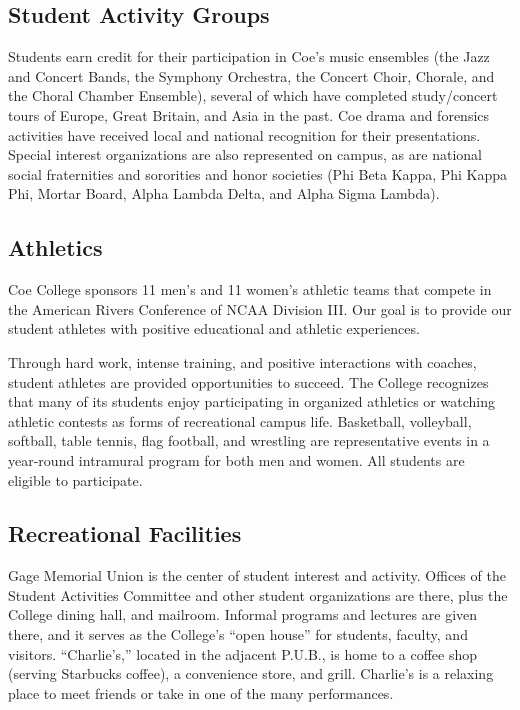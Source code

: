 \documentclass[
  letterpaper,
]{scrbook}
\begin{document}
\subsection{Student Activity Groups}\label{student-activity-groups}

Students earn credit for their participation in Coe's music ensembles
(the Jazz and Concert Bands, the Symphony Orchestra, the Concert Choir,
Chorale, and the Choral Chamber Ensemble), several of which have
completed study/concert tours of Europe, Great Britain, and Asia in the
past. Coe drama and forensics activities have received local and
national recognition for their presentations. Special interest
organizations are also represented on campus, as are national social
fraternities and sororities and honor societies (Phi Beta Kappa, Phi
Kappa Phi, Mortar Board, Alpha Lambda Delta, and Alpha Sigma Lambda).

\subsection{Athletics}\label{athletics}

Coe College sponsors 11 men's and 11 women's athletic teams that compete
in the American Rivers Conference of NCAA Division III. Our goal is to
provide our student athletes with positive educational and athletic
experiences.

Through hard work, intense training, and positive interactions with
coaches, student athletes are provided opportunities to succeed. The
College recognizes that many of its students enjoy participating in
organized athletics or watching athletic contests as forms of
recreational campus life. Basketball, volleyball, softball, table
tennis, flag football, and wrestling are representative events in a
year-round intramural program for both men and women. All students are
eligible to participate.

\subsection{Recreational Facilities}\label{recreational-facilities}

Gage Memorial Union is the center of student interest and activity.
Offices of the Student Activities Committee and other student
organizations are there, plus the College dining hall, and mailroom.
Informal programs and lectures are given there, and it serves as the
College's ``open house'' for students, faculty, and visitors.
``Charlie's,'' located in the adjacent P.U.B., is home to a coffee shop
(serving Starbucks coffee), a convenience store, and grill. Charlie's is
a relaxing place to meet friends or take in one of the many
performances.
\end{document}
